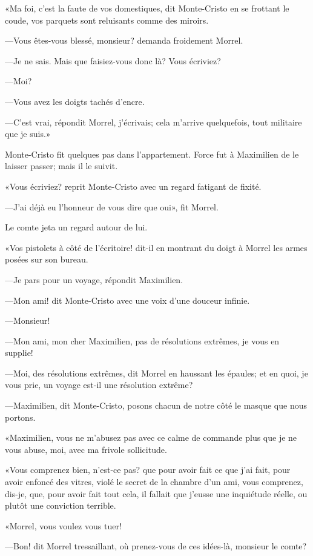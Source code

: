 «Ma foi, c'est la faute de vos domestiques, dit Monte-Cristo en se frottant le coude, vos parquets sont reluisants comme des miroirs. 

—Vous êtes-vous blessé, monsieur? demanda froidement Morrel. 

—Je ne sais. Mais que faisiez-vous donc là? Vous écriviez? 

—Moi? 

—Vous avez les doigts tachés d'encre. 

—C'est vrai, répondit Morrel, j'écrivais; cela m'arrive quelquefois, tout militaire que je suis.» 

Monte-Cristo fit quelques pas dans l'appartement. Force fut à Maximilien de le laisser passer; mais il le suivit. 

«Vous écriviez? reprit Monte-Cristo avec un regard fatigant de fixité. 

—J'ai déjà eu l'honneur de vous dire que oui», fit Morrel. 

Le comte jeta un regard autour de lui. 

«Vos pistolets à côté de l'écritoire! dit-il en montrant du doigt à Morrel les armes posées sur son bureau. 

—Je pars pour un voyage, répondit Maximilien. 

—Mon ami! dit Monte-Cristo avec une voix d'une douceur infinie. 

—Monsieur! 

—Mon ami, mon cher Maximilien, pas de résolutions extrêmes, je vous en supplie! 

—Moi, des résolutions extrêmes, dit Morrel en haussant les épaules; et en quoi, je vous prie, un voyage est-il une résolution extrême? 

—Maximilien, dit Monte-Cristo, posons chacun de notre côté le masque que nous portons. 

«Maximilien, vous ne m'abusez pas avec ce calme de commande plus que je ne vous abuse, moi, avec ma frivole sollicitude. 

«Vous comprenez bien, n'est-ce pas? que pour avoir fait ce que j'ai fait, pour avoir enfoncé des vitres, violé le secret de la chambre d'un ami, vous comprenez, dis-je, que, pour avoir fait tout cela, il fallait que j'eusse une inquiétude réelle, ou plutôt une conviction terrible. 

«Morrel, vous voulez vous tuer! 

—Bon! dit Morrel tressaillant, où prenez-vous de ces idées-là, monsieur le comte? 

